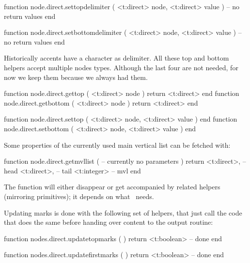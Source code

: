 function node.direct.settopdelimiter (
    <t:direct> node,
    <t:direct> value
)
    -- no return values
end

function node.direct.setbottomdelimiter (
    <t:direct> node,
    <t:direct> value
)
    -- no return values
end
\stoptyping

Historically accents have a character as delimiter. All these top and bottom
helpers accept multiple nodes types. Although the last four are not needed, for
now we keep them because we always had them.

\starttyping[option=LUA]
function node.direct.gettop    ( <t:direct> node ) return <t:direct> end
function node.direct.getbottom ( <t:direct> node ) return <t:direct> end

function node.direct.settop    ( <t:direct> node, <t:direct> value ) end
function node.direct.setbottom ( <t:direct> node, <t:direct> value ) end
\stoptyping

%

\stopsubsection

\startsubsection[title={MVL}]

Some properties of the currently used main vertical list can be fetched with:

\starttyping[option=LUA]
function node.direct.getmvllist (
    -- currently no parameters
)
    return
        <t:direct>,  -- head
        <t:direct>,  -- tail
        <t:integer> -- mvl
end
\stoptyping

\stopsubsection

\startsubsection[title={Balancing}]

The  function will either disappear or get accompanied
by related helpers (mirroring primitives); it depends on what \CONTEXT\ needs.

Updating marks is done with the following set of helpers, that just call the code
that does the same before handing over content to the output routine:

\starttyping[option=LUA]
function nodes.direct.updatetopmarks ( )
    return <t:boolean> -- done
end

function nodes.direct.updatefirstmarks ( )
    return <t:boolean> -- done
end

